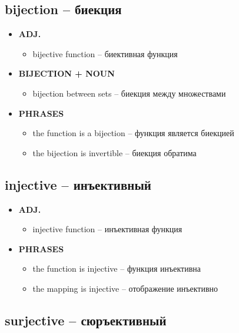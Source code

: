 \documentclass[a4paper, 10pt]{article}
\theoremstyle{definition}
\theoremstyle{plain}
\theoremstyle{remark}
\begin{document}
\subsection{bijection – биекция}

\begin{itemize}
    \item \textbf{ADJ.}
    \begin{itemize}
        \item bijective function – биективная функция
    \end{itemize}
    
    \item \textbf{BIJECTION + NOUN}
    \begin{itemize}
        \item bijection between sets – биекция между множествами
    \end{itemize}
    
    \item \textbf{PHRASES}
    \begin{itemize}
        \item the function is a bijection – функция является биекцией
        \item the bijection is invertible – биекция обратима
    \end{itemize}
\end{itemize}

\subsection{injective – инъективный}

\begin{itemize}
    \item \textbf{ADJ.}
    \begin{itemize}
        \item injective function – инъективная функция
    \end{itemize}
    
    \item \textbf{PHRASES}
    \begin{itemize}
        \item the function is injective – функция инъективна
        \item the mapping is injective – отображение инъективно
    \end{itemize}
\end{itemize}

\subsection{surjective – сюръективный}
\end{document}
